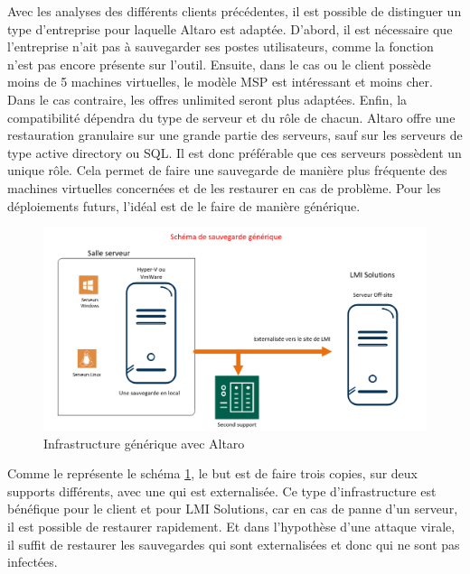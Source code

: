 \documentclass[pfe]{tnreport} %
\begin{document}
Avec les analyses des différents clients précédentes, il est possible de distinguer un type d'entreprise pour laquelle Altaro est adaptée. \newline
D'abord, il est nécessaire que l'entreprise n'ait pas à sauvegarder ses postes utilisateurs, comme la fonction n'est pas encore présente sur l'outil. \newline
Ensuite, dans le cas ou le client possède moins de 5 machines virtuelles, le modèle MSP est intéressant et moins cher. Dans le cas contraire, les offres unlimited seront plus adaptées. \newline
Enfin, la compatibilité dépendra du type de serveur et du rôle de chacun. Altaro offre une restauration granulaire sur une grande partie des serveurs, sauf sur les serveurs de type active directory ou SQL. \newline Il est donc préférable que ces serveurs possèdent un unique rôle. Cela permet de faire une sauvegarde de manière plus fréquente des machines virtuelles concernées et de les restaurer en cas de problème. \newline
Pour les déploiements futurs, l'idéal est de le faire de manière générique.

\begin{figure}[ht]
 \centering
 \includegraphics[width=17cm]{figures/générik.png}
 \caption{Infrastructure générique avec Altaro}
 \label{fig:generik}
\end{figure}

Comme le représente le schéma \ref{fig:generik}, le but est de faire trois copies, sur deux supports différents, avec une qui est externalisée. Ce type d'infrastructure est bénéfique pour le client et pour LMI Solutions, car en cas de panne d'un serveur, il est possible de restaurer rapidement. Et dans l'hypothèse d'une attaque virale, il suffit de restaurer les sauvegardes qui sont externalisées et donc qui ne sont pas infectées.
\end{document}
